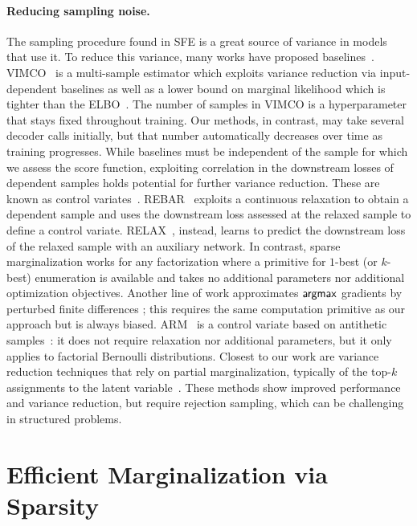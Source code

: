 \paragraph*{Reducing sampling noise.} The sampling procedure found in
SFE is a great source of variance in models that use it.
To reduce this variance, many works have proposed
baselines~\citep{Williams1992,MuProp,CV2013}. VIMCO~\citep{VIMCO} is
a multi-sample estimator which exploits variance reduction via
input-dependent baselines as well as a lower bound on marginal
likelihood which is tighter than the ELBO~\citep{IWAE}. The number of
samples in VIMCO is a hyperparameter that stays fixed throughout
training. Our methods, in contrast, may take several decoder calls
initially, but that number automatically decreases over time as
training progresses. While baselines must be independent of the
sample for which we assess the score function, exploiting correlation
in the downstream losses of dependent samples holds potential for
further variance reduction. These are known as control
variates~\citep{GreensmithEtAl}. REBAR~\citep{REBAR} exploits a
continuous relaxation to obtain a dependent sample and uses the
downstream loss assessed at the relaxed sample to define a control
variate. RELAX~\citep{RELAX}, instead, learns to predict the
downstream loss of the relaxed sample with an auxiliary network. In
contrast, sparse marginalization works for any factorization where a
primitive for $1$-best (or $k$-best) enumeration is available and
takes no additional parameters nor additional optimization
objectives. Another line of work approximates $\operatorname*{\mathsf{argmax}}$ gradients by
perturbed finite differences \cite{lorberbom2019direct,vlastelica};
this requires the same computation primitive as our approach but is
always biased. ARM~\citep{yin2019arm} is a control variate based on
antithetic samples~\citep{mcbook}: it does not require relaxation nor
additional parameters, but it only applies to factorial Bernoulli
distributions. Closest to our work are variance reduction techniques
that rely on partial marginalization, typically of the top-$k$
assignments to the latent variable~\citep{RB19,Kool2020Estimating}.
These methods show improved performance and variance reduction, but
require rejection sampling, which can be challenging in structured
problems.

\section{Efficient Marginalization via Sparsity}
\label{sec:categorical}

